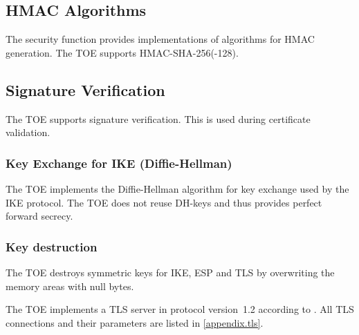 \subsection{HMAC Algorithms}%
\label{sf.cryptographicservices.hmac}

The security function provides implementations of algorithms for HMAC
generation. The TOE supports HMAC-SHA-256(-128).



\subsection{Signature Verification}%
\label{sf.cryptographicservices.sigver}

The TOE supports signature verification. This is used during certificate
validation.

\subsubsection{Key Exchange for  IKE (Diffie-Hellman)}%
\label{sf.cryptographicservices.ipsec.keyexc}

The TOE implements the Diffie-Hellman algorithm for key exchange used by the IKE
protocol. The TOE does not reuse DH-keys and thus provides perfect forward
secrecy.


\subsubsection{Key destruction}%
\label{sf.cryptographicservices.ipsec.keydest}

The TOE destroys symmetric keys for IKE, ESP and TLS by overwriting the memory
areas with null bytes.



The TOE implements a TLS server in protocol version~1.2 according to
. All TLS connections and their parameters are listed in
\autoref{appendix.tls}.


